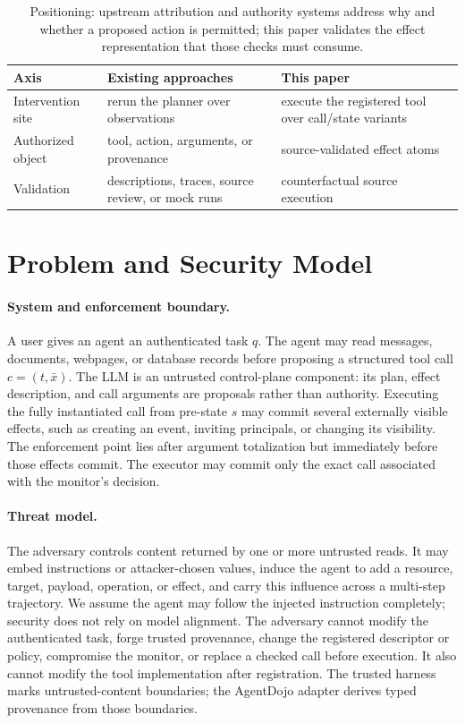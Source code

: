 \documentclass[letterpaper,twocolumn,10pt]{article}
\theoremstyle{definition}
\begin{document}
\begin{table}[t]
\centering
\small
\caption{Positioning: upstream attribution and authority systems address why
and whether a proposed action is permitted; this paper validates the
effect representation that those checks must consume.}
\label{tab:positioning}
\begin{tabular}{@{}p{}p{}p{}@{}}
\toprule
Axis & Existing approaches & This paper \\
\midrule
Intervention site & rerun the planner over observations &
execute the registered tool over call/state variants \\
Authorized object & tool, action, arguments, or provenance &
source-validated effect atoms \\
Validation & descriptions, traces, source review, or mock runs &
counterfactual source execution \\
\bottomrule
\end{tabular}
\end{table}

\section{Problem and Security Model}
\label{sec:threat-model}

\paragraph{System and enforcement boundary.}
A user gives an agent an authenticated task $q$.  The agent may read messages,
documents, webpages, or database records before proposing a structured tool
call $c=(t,\bar{x})$.  The LLM is an untrusted control-plane component: its plan,
effect description, and call arguments are proposals rather than authority.
Executing the fully instantiated call from pre-state $s$ may commit several
externally visible effects, such as creating an event, inviting principals, or
changing its visibility.  The enforcement point lies after argument
totalization but immediately before those effects commit.  The executor may
commit only the exact call associated with the monitor's decision.

\paragraph{Threat model.}
The adversary controls content returned by one or more untrusted reads.  It may
embed instructions or attacker-chosen values, induce the agent to add a
resource, target, payload, operation, or effect, and carry this influence across
a multi-step trajectory.  We assume the agent may follow the injected
instruction completely; security does not rely on model alignment.  The
adversary cannot modify the authenticated task, forge trusted provenance,
change the registered descriptor or policy, compromise the monitor, or replace
a checked call before execution.  It also cannot modify the tool implementation
after registration.  The trusted harness marks untrusted-content boundaries;
the AgentDojo adapter derives typed provenance from those boundaries.
\end{document}
